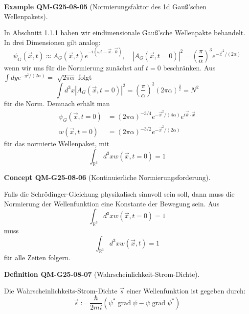 \documentclass[10pt, letterpaper]{article}
\newcommand{\CustomHeading}[3]{%
  \par\medskip\noindent%
  \textbf{#1 #2} \textnormal{(#3)}.\enskip%
}
\newenvironment{DEF}[2]{\CustomHeading{Definition}{#1}{#2}}{}
\newenvironment{EXA}[2]{\CustomHeading{Example}{#1}{#2}}{}
\newenvironment{CONC}[2]{\CustomHeading{Concept}{#1}{#2}}{}
\begin{document}
\begin{EXA}{QM-G25-08-05}{Normierungsfaktor des 1d Gauß'schen Wellenpakets}
In Abschnitt 1.1.1 haben wir eindimensionale Gauß'sche Wellenpakte behandelt. In drei Dimensionen gilt analog:
$$
\psi_{G}(\vec{x}, t) \approx A_{G}(\vec{x}, t) e^{-i(\omega t-\vec{x} \cdot \vec{k})}, \quad\left|A_{G}(\vec{x}, t=0)\right|^{2}=\left(\frac{\pi}{\alpha}\right)^{3} e^{-\vec{x}^{2} /(2 \alpha)}
$$
wenn wir uns für die Normierung zunächst auf $t=0$ beschränken. Aus $\int d y e^{-y^{2} /(2 \alpha)}=$ $\sqrt{2 \pi \alpha}$ folgt
$$
\int d^{3} x\left|A_{G}(\vec{x}, t=0)\right|^{2}=\left(\frac{\pi}{\alpha}\right)^{3}(2 \pi \alpha)^{\frac{3}{2}}=N^{2}
$$
für die Norm. Demnach erhält man
$$
\begin{aligned}
\psi_{G}(\vec{x}, t=0) & =(2 \pi \alpha)^{-3 / 4} e^{-\vec{x}^{2} /(4 \alpha)} e^{i \vec{k} \cdot \vec{x}} \\
w(\vec{x}, t=0) & =(2 \pi \alpha)^{-3 / 2} e^{-\vec{x}^{2} /(2 \alpha)}
\end{aligned}
$$
für das normierte Wellenpaket, mit
$$
\int_{\mathbb{R}^{3}} d^{3} x w(\vec{x}, t=0)=1
$$
\end{EXA}

\begin{CONC}{QM-G25-08-06}{Kontinuierliche Normierungsforderung}
Falls die Schrödinger-Gleichung physikalisch sinnvoll sein soll, dann muss die Normierung der Wellenfunktion eine Konstante der Bewegung sein. Aus
$$
\int_{\mathbb{R}^{3}} d^{3} x w(\vec{x}, t=0)=1
$$
muss
$$
\int_{\mathbb{R}^{3}} d^{3} x w(\vec{x}, t)=1
$$
für alle Zeiten folgern.
\end{CONC}

\begin{DEF}{QM-G25-08-07}{Wahrscheinlichkeit-Strom-Dichte}
Die Wahrscheinlichkeits-Strom-Dichte $\vec{s}$ einer Wellenfunktion ist gegeben durch:
$$
\vec{s}:=\frac{\hbar}{2 m i}\left(\psi^{*} \operatorname{grad} \psi-\psi \operatorname{grad} \psi^{*}\right)
$$
\end{DEF}
\end{document}

